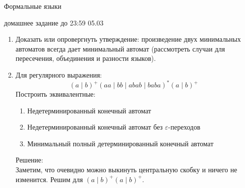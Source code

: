 \documentclass[12pt]{article}
\newenvironment{myauto}[1][3]
{
  \begin{center}
    \begin{tikzpicture}[> = stealth,node distance=#1cm, on grid, very thick]
}
{
    \end{tikzpicture}
  \end{center}
}
\begin{document}
\begin{center} {\LARGE Формальные языки} \end{center}

\begin{center} \Large домашнее задание до 23:59 05.03 \end{center}
\bigskip

\begin{enumerate}
  \item Доказать или опровергнуть утверждение: произведение двух минимальных автоматов всегда дает минимальный автомат (рассмотреть случаи для пересечения, объединения и разности языков).
  \item Для регулярного выражения:
   \[ (a \mid b)^+ (aa \mid bb \mid abab \mid baba)^* (a \mid b)^+\]
  Построить эквивалентные:
  \begin{enumerate}
    \item Недетерминированный конечный автомат
    \item Недетерминированный конечный автомат без $\varepsilon$-переходов
    \item Минимальный полный детерминированный конечный автомат\\
	\end{enumerate}
    Решение:\\
    Заметим, что очевидно можно выкинуть центральную скобку и ничего не изменится. Решим для $(a \mid b)^+(a \mid b)^+$.\\
\end{enumerate}
\end{document}
